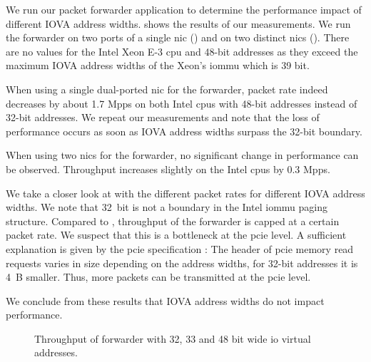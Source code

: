 We run our packet forwarder application to determine the performance impact of
different IOVA address widths.  shows
the results of our measurements. We run the forwarder on two ports of a single
\ac{nic} () and on two
distinct \acp{nic} ().
There are no values for the Intel Xeon E-3 \ac{cpu} and 48-bit addresses as they
exceed the maximum IOVA address widths of the Xeon's \ac{iommu} which is 39 bit.

When using a single dual-ported \ac{nic} for the forwarder, packet rate indeed
decreases by about 1.7 Mpps on both Intel \acp{cpu} with 48-bit addresses
instead of 32-bit addresses. We repeat our measurements and note that the loss
of performance occurs as soon as IOVA address widths surpass the 32-bit
boundary.

When using two \acp{nic} for the forwarder, no significant change in performance
can be observed. Throughput increases slightly on the Intel \acp{cpu} by 0.3
Mpps.

We take a closer look at 
with the different packet rates for different IOVA address widths. We note that
32~bit is not a boundary in the Intel \ac{iommu} paging structure. Compared to
, throughput of the
forwarder is capped at a certain packet rate. We suspect that this is a
bottleneck at the \ac{pcie} level. A sufficient explanation is given by the
\ac{pcie} specification \cite{pcie2017specification}: The header of \ac{pcie}
memory read requests varies in size depending on the address widths, for 32-bit
addresses it is 4~B smaller. Thus, more packets can be transmitted at the
\ac{pcie} level.

We conclude from these results that IOVA address widths do not impact
performance. 

\begin{figure}%
	\centering

    \caption{Throughput of forwarder with 32, 33 and 48 bit wide \acs{io} virtual
        addresses.}
	\label{fig:iova-address-widths-throughput}
\end{figure}


